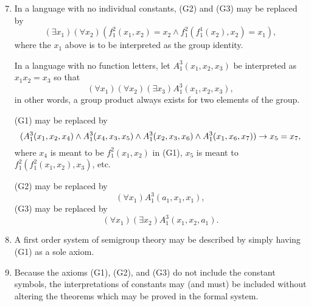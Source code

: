 \solutions{}
\begin{enumerate}
  \setcounter{enumi}{6}
  \item %
    In a language with no individual constants, (G2) and (G3) may be replaced by
    \[(\exists x_1)(\forall x_2)(f^2_1(x_1, x_2) = x_2 \land f^2_1(f^1_1(x_2), x_2) = x_1),\]
    where the \(x_1\) above is to be interpreted as the group identity.

    In a language with no function letters, let \(A^3_1(x_1, x_2, x_3)\) be interpreted as \(x_1x_2 = x_3\) so that
    \[(\forall x_1)(\forall x_2)(\exists x_3)A^3_1(x_1, x_2, x_3),\]
    in other words, a group product always exists for two elements of the group.

    (G1) may be replaced by
    \[(A^3_1(x_1, x_2, x_4) \land A^3_1(x_4, x_3, x_5) \land A^3_1(x_2, x_3, x_6) \land A^3_1(x_1, x_6, x_7)) \rightarrow x_5 = x_7,\]
    where \(x_4\) is meant to be \(f^2_1(x_1, x_2)\) in (G1), \(x_5\) is meant to \(f^2_1(f^2_1(x_1, x_2), x_3)\), etc.

    (G2) may be replaced by
    \[(\forall x_1)A^3_1(a_1, x_1, x_1),\]
    (G3) may be replaced by
    \[(\forall x_1)(\exists x_2)A^3_1(x_1, x_2, a_1).\]

  \item %
    A first order system of semigroup theory may be described by simply having (G1) as a sole axiom.

  \item %
    Because the axioms (G1), (G2), and (G3) do not include the constant symbols, the interpretations of constants may (and must) be included without altering the theorems which may be proved in the formal system.


\end{enumerate}
